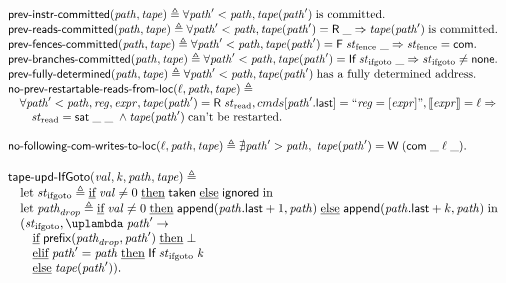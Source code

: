{\[
\begin{array}{l}
\prevInstrCommitted(\cpath, \tape) \triangleq \forall \cpath' < \cpath, \tape(\cpath') \; \text{is committed}. \\
\prevReadsCommitted(\cpath, \tape) \triangleq
  \forall \cpath' < \cpath, \tape(\cpath') = \tapeRead{\_} => \tape(\cpath') \; \text{is committed}. \\
\prevFencesCommitted(\cpath, \tape) \triangleq
  \forall \cpath' < \cpath, \tape(\cpath') = \tapeFence{\Fstate}{\_} => \Fstate = \Committed. \\
\prevBrCommitted(\cpath, \tape) \triangleq
  \forall \cpath' < \cpath, \tape(\cpath') = \tapeIfGoto{\IfState}{\_} => \IfState \not = \None. \\
\prevCmdDetermined(\cpath, \tape) \triangleq
  \forall \cpath' < \cpath, \tape(\cpath') \; \text{has a fully determined address}. \\
\prevNoRestart(\loc, \cpath, \tape) \triangleq \\
\quad \forall \cpath' < \cpath, \reg, \expr, \tape(\cpath') = \tapeRead{\Rstate},
      \Carm[\lastInstr{\cpath'}] = ``\reg = [\expr]", |[\expr|] = \loc => \\
\quad \quad \Rstate = \tapeSatisfied{\_}{\_} \; \land \tape(\cpath') \; \text{can't be restarted}. \\
\\
\noFollowingWcom(\loc, \cpath, \tape) \triangleq
  \nexists \cpath' > \cpath, \; \tape(\cpath') = \tapeWrite{(\tapeWriteCommitted{\_}{\loc}{\_})}. \\
\end{array}
\]

\[
\begin{array}{l}
\tapeUpdIf(\stval, \z, \cpath, \tape) \triangleq \\
\quad \text{let} \; \IfState \triangleq
      \textIf \stval \not = 0 \; \textThen \Taken \; \textElse \Ignored \; \text{in} \\
\quad \text{let} \; \cpath_{drop} \triangleq
      \textIf \stval \not = 0 \;
      \textThen \mathsf{append}(\lastInstr{\cpath} + 1, \cpath) \;
      \textElse \mathsf{append}(\lastInstr{\cpath} + k, \cpath) \; \text{in} \\
\quad (\IfState, \lambda \; \cpath' -> \\
\quad \quad \textIf \mathsf{prefix}(\cpath_{drop}, \cpath') \; \textThen \bot \\
\quad \quad \textElif \cpath' = \cpath \; \textThen \tapeIfGoto{\IfState}{\z} \\
\quad \quad \textElse \tape(\cpath')). \\
\end{array}
\]

}
